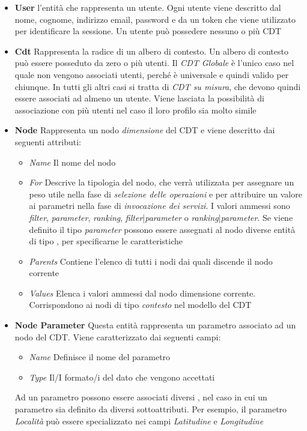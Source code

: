 \begin{itemize}
	\item \textbf{User} \upe l'entità che rappresenta un utente. Ogni utente viene descritto dal nome, cognome, indirizzo email, password e da un token che viene utilizzato per identificare la sessione. Un utente può possedere nessuno o più CDT
	\item \textbf{Cdt} Rappresenta la radice di un albero di contesto. Un albero di contesto può essere posseduto da zero o più utenti. Il \emph{CDT Globale} è l'unico caso nel quale non vengono associati utenti, perché è universale e quindi valido per chiunque. In tutti gli altri casi si tratta di \emph{CDT su misura}, che devono quindi essere associati ad almeno un utente. Viene lasciata la possibilità di associazione con più utenti nel caso il loro profilo sia molto simile
	\item \textbf{Node} Rappresenta un nodo \emph{dimensione} del CDT e viene descritto dai seguenti attributi:
	\begin{itemize}
		\item \emph{Name} Il nome del nodo
		\item \emph{For} Descrive la tipologia del nodo, che verrà utilizzata per assegnare un peso utile nella fase di \emph{selezione delle operazioni} e per attribuire un valore ai parametri nella fase di \emph{invocazione dei servizi}. I valori ammessi sono \emph{filter}, \emph{parameter}, \emph{ranking}, \emph{filter}|\emph{parameter} o \emph{ranking}|\emph{parameter}. Se viene definito il tipo \emph{parameter} possono essere assegnati al nodo diverse entità di tipo , per specificarne le caratteristiche
		\item \emph{Parents} Contiene l'elenco di tutti i nodi dai quali discende il nodo corrente
		\item \emph{Values} Elenca i valori ammessi dal nodo dimensione corrente. Corrispondono ai nodi di tipo \emph{contesto} nel modello del CDT
	\end{itemize}
	\item \textbf{Node Parameter} Questa entità rappresenta un parametro associato ad un nodo del CDT. Viene caratterizzato dai seguenti campi:
	\begin{itemize}
		\item \emph{Name} Definisce il nome del parametro
		\item \emph{Type} Il/I formato/i del dato che vengono accettati
	\end{itemize}
	Ad un parametro possono essere associati diversi , nel caso in cui un parametro sia definito da diversi sottoattributi. Per esempio, il parametro \emph{Località} può essere specializzato nei campi \emph{Latitudine} e \emph{Longitudine}

\end{itemize}
